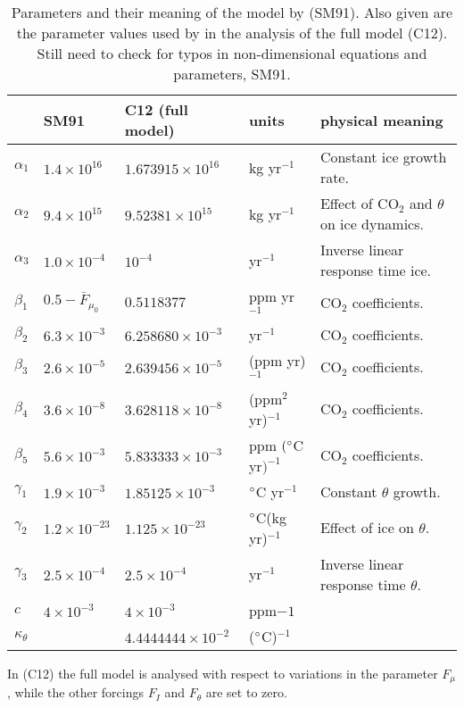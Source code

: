 \documentclass[12pt]{article}
\begin{document}
\begin{table}[b!]
\begin{tabular}{lllll}
\hline
& SM91 & C12 (full model) & units & physical meaning \\
\hline
$\alpha_1$ & $1.4\times 10^{16}$ & $1.673915\times10^{16}$ & kg yr$^{-1}$  & Constant ice growth rate. \\
$\alpha_2$ & $9.4\times 10^{15}$ & $9.52381\times10^{15}$ & kg yr$^{-1}$ & Effect of CO$_2$ and $\theta$ on ice dynamics.\\
$\alpha_3$ & $1.0\times 10^{-4}$  & $10^{-4}$ & yr$^{-1}$ & Inverse linear response time ice.\\
$\beta_1$  & $0.5-\bar{F}_{\mu_0}$ & $0.5118377$ & ppm yr$^{-1}$& CO$_2$ coefficients.\\
$\beta_2$ & $6.3\times 10^{-3}$ & $ 6.258680\times 10^{-3}$ & yr$^{-1}$ & CO$_2$ coefficients.\\
$\beta_3$ & $2.6\times 10^{-5}$ & $2.639456\times 10^{-5}$ & (ppm yr)$^{-1}$ & CO$_2$ coefficients.\\
$\beta_4$ & $3.6\times 10^{-8}$ & $3.628118\times 10^{-8}$ & (ppm$^2$ yr)$^{-1}$   & CO$_2$ coefficients.\\
$\beta_5$ & $5.6\times 10^{-3}$ & $5.833333\times 10^{-3}$ & ppm $(\degree$C yr$)^{-1}$ & CO$_2$ coefficients.\\
$\gamma_1$ & $1.9\times 10^{-3}$ & $1.85125\times 10^{-3}$ & $\degree$C yr$^{-1}$ & Constant $\theta$ growth.\\
$\gamma_2$ & $1.2\times 10^{-23}$ & $1.125\times 10^{-23}$ & $\degree$C(kg yr)$^{-1}$ & Effect of ice on $\theta$.\\
$\gamma_3$ & $2.5\times 10^{-4}$ & $2.5\times 10^{-4}$ & yr$^{-1}$ & Inverse linear response time $\theta$.\\
$c$ & $4\times 10^{-3}$ &$4\times 10^{-3}$ & ppm${-1}$ & \\
$\kappa_\theta$ & & $4.4444444\times 10^{-2}$ & ($\degree$C)$^{-1}$ &\\
\hline
\end{tabular}
\label{t:SM91}
\caption{Parameters and their meaning of the model by \cite{Saltzman:1991jl} (SM91). Also given are the parameter values used by \cite{Crucifix2012a} in the analysis of the full model (C12). {\color{red} Still need to check for typos in non-dimensional equations and parameters, SM91.} }
\end{table}

In \cite{Crucifix2012a} (C12) the full model is analysed with respect to variations in the parameter $F_{\mu}$, while the other forcings $F_{I}$ and $F_{\theta}$ are set to zero. 
\end{document}
